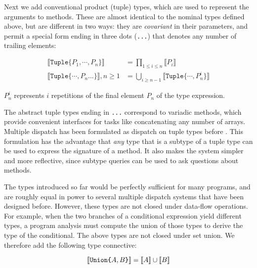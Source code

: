 Next we add conventional product (tuple) types, which are used to represent the
arguments to methods. These are almost identical to the nominal types defined above,
but are different in two ways: they are \emph{covariant} in their parameters, and permit
a special form ending in three dots (\texttt{...}) that denotes any number of trailing
elements:

\vspace{-2ex}
\begin{align*}
  \llbracket \texttt{Tuple\{}P_1,\cdots,P_n\texttt{\}} \rrbracket &= \prod_{1\leq i \leq n} \llbracket P_i \rrbracket \\
  \llbracket \texttt{Tuple\{}\cdots,P_n\texttt{...\}} \rrbracket, n\geq 1 &= \bigcup_{i\geq n-1} \llbracket \texttt{Tuple\{}\cdots,P_n^i\texttt{\}} \rrbracket
\end{align*}

\noindent
$P_n^i$ represents $i$ repetitions of the final element $P_n$ of the type expression.

The abstract tuple types ending in \texttt{...} correspond to variadic methods, which
provide convenient interfaces for tasks like concatenating any number of arrays.
Multiple dispatch has been formulated as dispatch on tuple types before \cite{Leavens1998}.
This formulation has the advantage that \emph{any} type that is a subtype of a
tuple type can be used to express the signature of a method. It also makes the system
simpler and more reflective, since subtype queries can be used to ask questions about
methods.

The types introduced so far would be perfectly sufficient for many programs, and are
roughly equal in power to several multiple dispatch systems that have been designed
before. However, these types are not closed under data-flow operations. For example,
when the two branches of a conditional expression yield different types, a program
analysis must compute the union of those types to derive the type of the conditional.
The above types are not closed under set union. We therefore add the following
type connective:

\[
  \llbracket \texttt{Union\{}A,B\texttt{\}} \rrbracket = \llbracket A \rrbracket \cup \llbracket B \rrbracket \\
\]

